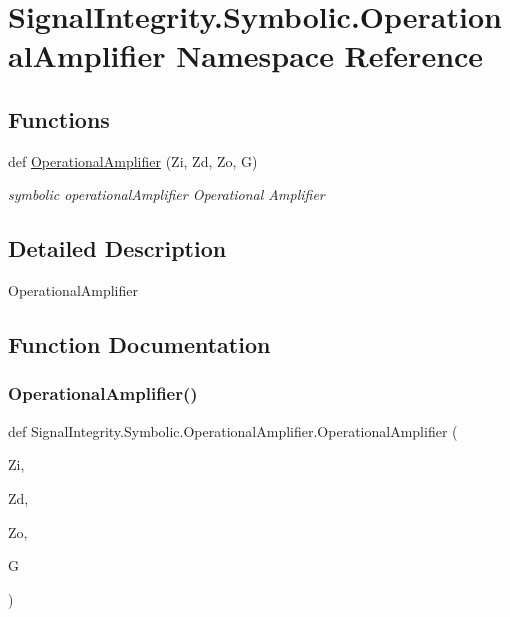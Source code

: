\hypertarget{namespaceSignalIntegrity_1_1Symbolic_1_1OperationalAmplifier}{}\section{Signal\+Integrity.\+Symbolic.\+Operational\+Amplifier Namespace Reference}
\label{namespaceSignalIntegrity_1_1Symbolic_1_1OperationalAmplifier}
\subsection*{Functions}
\begin{DoxyCompactItemize}
\item 
def \hyperlink{namespaceSignalIntegrity_1_1Symbolic_1_1OperationalAmplifier_a9b8547556865185cefe045124b3686d8}{Operational\+Amplifier} (Zi, Zd, Zo, G)
\begin{DoxyCompactList}\small\item\em symbolic operational\+Amplifier Operational Amplifier \end{DoxyCompactList}\end{DoxyCompactItemize}


\subsection{Detailed Description}
\begin{DoxyVerb}OperationalAmplifier\end{DoxyVerb}
 

\subsection{Function Documentation}
\mbox{\label{namespaceSignalIntegrity_1_1Symbolic_1_1OperationalAmplifier_a9b8547556865185cefe045124b3686d8}} 
\subsubsection{\texorpdfstring{Operational\+Amplifier()}{OperationalAmplifier()}}
{\footnotesize\ttfamily def Signal\+Integrity.\+Symbolic.\+Operational\+Amplifier.\+Operational\+Amplifier (\begin{DoxyParamCaption}\item[{}]{Zi,  }\item[{}]{Zd,  }\item[{}]{Zo,  }\item[{}]{G }\end{DoxyParamCaption})}



